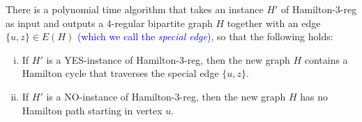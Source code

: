 \documentclass[runningheads]{llncs}
\newcommand{\xxxHAM}{{\sc Hamilton-3-reg}}
\newcommand{\lasse}[1]{\textcolor{blue}{#1}}
\begin{document}
\begin{lemma}
\label{le:Ham-to-Ham}
There is a polynomial time algorithm that takes an instance $H'$ of {\xxxHAM} as input and outputs 
a 4-regular bipartite graph $H$ together with an edge $\{u,z\}\in E(H)$ \lasse{(which we call the \emph{special edge})},
so that the following holds:
\begin{enumerate}[(i)]
\item If $H'$ is a YES-instance of {\xxxHAM}, then the new graph $H$ contains a Hamilton cycle 
that traverses the special edge $\{u,z\}$.
\item If $H'$ is a NO-instance of {\xxxHAM}, then the new graph $H$ has no Hamilton path
starting in vertex $u$. 
\end{enumerate}
\end{lemma}
\end{document}
